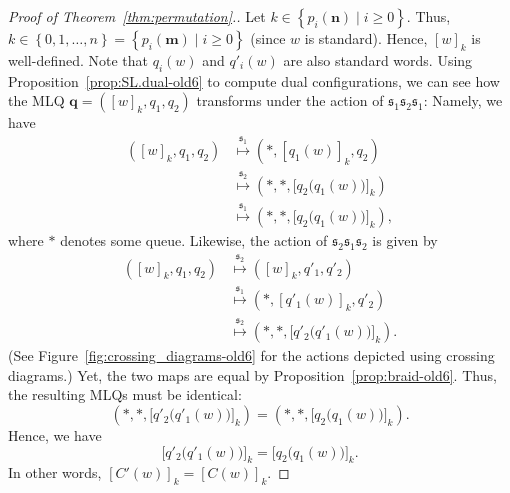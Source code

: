 \documentclass[reqno]{amsart}
\newcommand{\0}{\phantom{c}}
\newcommand{\mm}{\mathbf{m}}
\newcommand{\nn}{\mathbf{n}}
\newcommand{\qq}{\mathbf{q}}
\newcommand{\fraks}{\mathfrak{s}}
\newenvironment{verlong}{}{}
\newcommand{\set}[1]{\left\{ #1 \right\}}
\newcommand{\tup}[1]{\left( #1 \right)}
\theoremstyle{plain}
\theoremstyle{definition}
\numberwithin{equation}{section}
\begin{document}
\begin{verlong}
\begin{proof}[Proof of Theorem~\ref{thm:permutation}.]
Let $k \in \set{ p_i(\nn) \mid i \geq 0}$.
Thus, $k \in \set{0, 1, \ldots, n} = \set{ p_i(\mm) \mid i \geq 0 }$ (since $w$ is standard).
Hence, $[w]_k$ is well-defined.
Note that $q_i(w)$ and $q'_i(w)$ are also standard words.
Using Proposition~\ref{prop:SL.dual-old6} to compute dual
configurations, we can see how the MLQ
$\qq = \tup{[w]_k, q_1, q_2}$ transforms under the action of
$\fraks_1 \fraks_2 \fraks_1$: Namely, we have
\begin{align*}
\tup{[w]_k, q_1, q_2} & \overset{\fraks_1}{\longmapsto} \tup{\ast, [q_1(w)]_k, q_2}
\\ & \overset{\fraks_2}{\longmapsto} \tup{\ast, \ast, \bigl[ q_2\bigl( q_1(w) \bigr) \bigr]_k}
\\ & \overset{\fraks_1}{\longmapsto} \tup{\ast, \ast, \bigl[ q_2\bigl( q_1(w) \bigr) \bigr]_k},
\end{align*}
where $\ast$ denotes some queue.
Likewise, the action of $\fraks_2 \fraks_1 \fraks_2$ is given by
\begin{align*}
\tup{[w]_k, q_1, q_2} & \overset{\fraks_2}{\longmapsto} \tup{[w]_k, q'_1, q'_2}
\\ & \overset{\fraks_1}{\longmapsto} \tup{\ast, [q'_1(w)]_k , q'_2}
\\ & \overset{\fraks_2}{\longmapsto} \tup{\ast, \ast, \bigl[ q'_2\bigl( q'_1(w) \bigr) \bigr]_k}.
\end{align*}
(See Figure~\ref{fig:crossing_diagrams-old6} for the actions depicted using crossing diagrams.)
Yet, the two maps are equal by Proposition~\ref{prop:braid-old6}.
Thus, the resulting MLQs must be identical:
\[
\tup{\ast, \ast, \bigl[ q'_2\bigl(q'_1(w) \bigr) \bigr]_k}
=
\tup{\ast, \ast, \bigl[ q_2\bigl(q_1(w) \bigr) \bigr]_k}.
\]
Hence, we have
\[
\bigl[ q'_2\bigl( q'_1(w) \bigr) \bigr]_k = \bigl[ q_2\bigl( q_1(w) \bigr) \bigr]_k.
\]
In other words, $[C'(w)]_k = [C(w)]_k$.
\end{proof}


\end{verlong}
\end{document}
